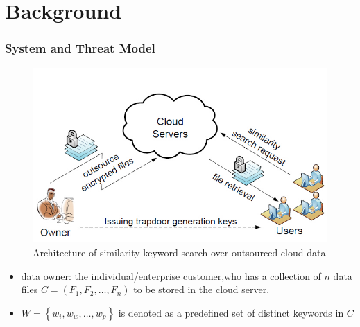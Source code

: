 \documentclass[handout]{beamer}
\begin{document}
\section{Background} %
\begin{frame}
	\frametitle{System and Threat Model}
	\begin{figure}
	\includegraphics[width=0.6\linewidth]{fig1.jpg}
	\caption[1]{Architecture of similarity keyword search over outsourced cloud data}
	\end{figure}
		\begin{itemize}
			\item<2-> data owner: the individual/enterprise customer,who has a collection of $n$ data files $C = ({F_1},{F_2}, \ldots ,{F_n})$ to be stored in the cloud server.
			\item<3-> $W = \left\{ {{w_i},{w_w}, \ldots ,{w_p}} \right\}$ is denoted as a predefined set of distinct keywords in $C$
		\end{itemize}
\end{frame}
\end{document}
